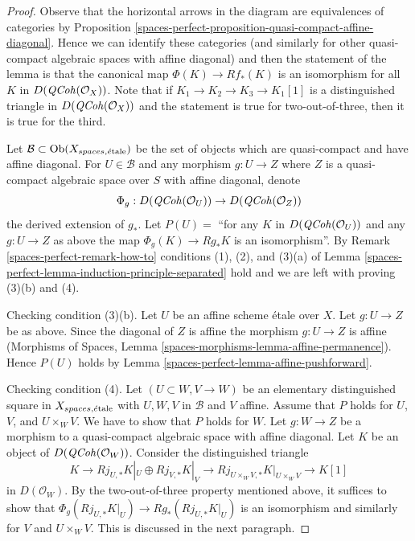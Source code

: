 \begin{proof}
Observe that the horizontal arrows in the diagram are
equivalences of categories by
Proposition \ref{spaces-perfect-proposition-quasi-compact-affine-diagonal}.
Hence we can identify these categories (and similarly for
other quasi-compact algebraic spaces with affine diagonal)
and then the statement of the lemma is that the canonical map
$\Phi(K) \to Rf_*(K)$ is an isomorphism for all $K$ in
$D(\mathit{QCoh}(\mathcal{O}_X))$. Note that if $K_1 \to K_2 \to K_3 \to K_1[1]$
is a distinguished triangle in $D(\mathit{QCoh}(\mathcal{O}_X))$ and
the statement is true for two-out-of-three, then it is true
for the third.

\medskip\noindent
Let $\mathcal{B} \subset \operatorname{Ob}(X_{spaces, \acute{e}\text{tale}})$ be the set of
objects which are quasi-compact and have affine diagonal.
For $U \in \mathcal{B}$ and any morphism $g : U \to Z$
where $Z$ is a quasi-compact algebraic space over $S$ with
affine diagonal, denote
$$
\Phi_g : D(\mathit{QCoh}(\mathcal{O}_U)) \to D(\mathit{QCoh}(\mathcal{O}_Z))
$$
the derived extension of $g_*$. Let
$P(U) =$ ``for any $K$ in $D(\mathit{QCoh}(\mathcal{O}_U))$
and any $g : U \to Z$ as above the map $\Phi_g(K) \to Rg_*K$
is an isomorphism''.
By Remark \ref{spaces-perfect-remark-how-to} conditions (1), (2), and (3)(a) of
Lemma \ref{spaces-perfect-lemma-induction-principle-separated} hold and we are
left with proving (3)(b) and (4).

\medskip\noindent
Checking condition (3)(b). Let $U$ be an affine scheme \'etale
over $X$. Let $g : U \to Z$ be as above. Since the diagonal of $Z$
is affine the morphism $g : U \to Z$
is affine (Morphisms of Spaces, Lemma
\ref{spaces-morphisms-lemma-affine-permanence}).
Hence $P(U)$ holds by Lemma \ref{spaces-perfect-lemma-affine-pushforward}.

\medskip\noindent
Checking condition (4).
Let $(U \subset W, V \to W)$ be an elementary distinguished square
in $X_{spaces, \acute{e}\text{tale}}$ with $U, W, V$ in $\mathcal{B}$ and $V$ affine.
Assume that $P$ holds for $U$, $V$, and $U \times_W V$.
We have to show that $P$ holds for $W$. Let $g : W \to Z$
be a morphism to a quasi-compact algebraic space with affine diagonal.
Let $K$ be an object of $D(\mathit{QCoh}(\mathcal{O}_W))$.
Consider the distinguished triangle
$$
K \to Rj_{U, *}K|_U \oplus Rj_{V, *}K|_V \to
Rj_{U \times_W V, *}K|_{U \times_W V} \to K[1]
$$
in $D(\mathcal{O}_W)$. By the two-out-of-three property mentioned
above, it suffices to show that $\Phi_g(Rj_{U, *}K|_U) \to Rg_*(Rj_{U, *}K|_U)$
is an isomorphism and similarly for $V$ and $U \times_W V$.
This is discussed in the next paragraph.


\end{proof}
